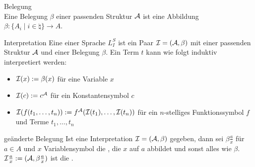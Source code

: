 \begin{Def}{Belegung}\\
    Eine Belegung $\beta$ einer passenden Struktur $\mathcal{A}$ ist eine Abbildung
    $\beta\colon \{A_i \;|\; i \in \natural\} \rightarrow A$.
\end{Def}

\begin{Def}{Interpretation}
    Eine  einer Sprache $L_I^S$ ist ein Paar $\mathcal{I} = (\mathcal{A}, \beta)$
    mit einer passenden Struktur $\mathcal{A}$ und einer Belegung $\beta$.
    Ein Term $t$ kann wie folgt induktiv interpretiert werden:
    \begin{itemize}
        \item
        $\mathcal{I}(x) := \beta(x)$ für eine Variable $x$
        
        \item
        $\mathcal{I}(c) := c^{\mathcal{A}}$ für ein Konstantensymbol $c$
        
        \item
        $\mathcal{I}(f(t_1, \dotsc, t_n)) := f^{\mathcal{A}}(\mathcal{I}(t_1), \dotsc, \mathcal{I}(t_n))$
        für ein $n$-stelliges Funktionssymbol $f$ und Terme $t_1, \dotsc, t_n$
    \end{itemize}
\end{Def}

\begin{Def}{geänderte Belegung}
    Ist eine Interpretation $\mathcal{I} = (\mathcal{A}, \beta)$ gegeben,
    dann sei $\beta \frac{a}{x}$ für $a \in A$ und $x$ Variablensymbol die
    ,
    die $x$ auf $a$ abbildet und sonst alles wie $\beta$.
    $\mathcal{I} \frac{a}{x} := (\mathcal{A}, \beta \frac{a}{x})$ ist die .
\end{Def}

\linie

